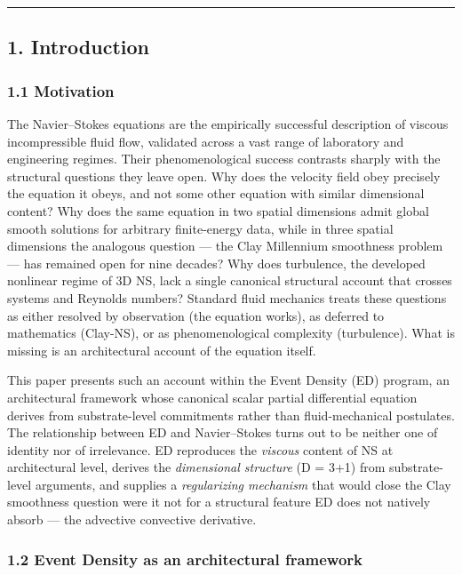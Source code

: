 \documentclass[
]{article}
\begin{document}
\begin{center}\rule{0.5\linewidth}{0.5pt}\end{center}

\subsection{1. Introduction}\label{introduction}

\subsubsection{1.1 Motivation}\label{motivation}

The Navier--Stokes equations are the empirically successful description
of viscous incompressible fluid flow, validated across a vast range of
laboratory and engineering regimes. Their phenomenological success
contrasts sharply with the structural questions they leave open. Why
does the velocity field obey precisely the equation it obeys, and not
some other equation with similar dimensional content? Why does the same
equation in two spatial dimensions admit global smooth solutions for
arbitrary finite-energy data, while in three spatial dimensions the
analogous question --- the Clay Millennium smoothness problem --- has
remained open for nine decades? Why does turbulence, the developed
nonlinear regime of 3D NS, lack a single canonical structural account
that crosses systems and Reynolds numbers? Standard fluid mechanics
treats these questions as either resolved by observation (the equation
works), as deferred to mathematics (Clay-NS), or as phenomenological
complexity (turbulence). What is missing is an architectural account of
the equation itself.

This paper presents such an account within the Event Density (ED)
program, an architectural framework whose canonical scalar partial
differential equation derives from substrate-level commitments rather
than fluid-mechanical postulates. The relationship between ED and
Navier--Stokes turns out to be neither one of identity nor of
irrelevance. ED reproduces the \emph{viscous} content of NS at
architectural level, derives the \emph{dimensional structure} (D = 3+1)
from substrate-level arguments, and supplies a \emph{regularizing
mechanism} that would close the Clay smoothness question were it not for
a structural feature ED does not natively absorb --- the advective
convective derivative.

\subsubsection{1.2 Event Density as an architectural
framework}\label{event-density-as-an-architectural-framework}
\end{document}
